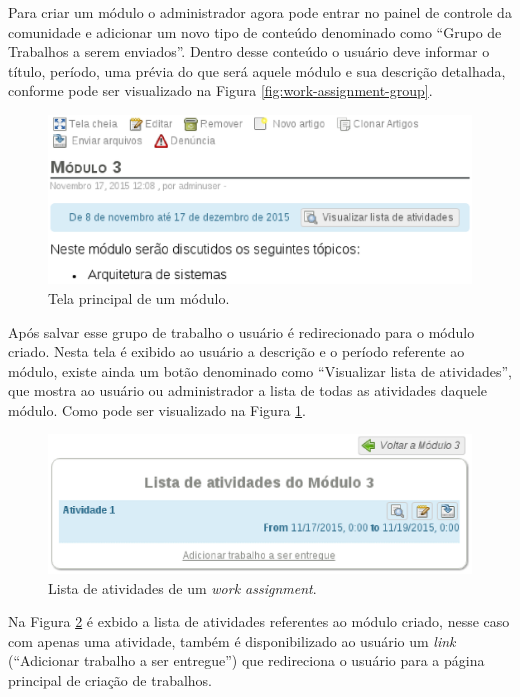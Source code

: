 Para criar um módulo o administrador agora pode entrar no painel de controle da comunidade e adicionar um novo tipo de conteúdo denominado como ``Grupo de Trabalhos a serem enviados''. Dentro desse conteúdo o usuário deve informar o título, período, uma prévia do que será aquele módulo e sua descrição detalhada, conforme pode ser visualizado na Figura \ref{fig:work-assignment-group}.

\begin{figure}[h]
    \centering
    \includegraphics[keepaspectratio=true,scale=0.6]
      {figuras/principal-group.eps}
    \caption{Tela principal de um módulo.}
    \label{fig:principal-group}
\end{figure}

Após salvar esse grupo de trabalho o usuário é redirecionado para o módulo criado. Nesta tela é exibido ao usuário a descrição e o período referente ao módulo, existe ainda um botão denominado como ``Visualizar lista de atividades'', que mostra ao usuário ou administrador a lista de todas as atividades daquele módulo. Como pode ser visualizado na Figura \ref{fig:principal-group}.

\begin{figure}[h]
    \centering
    \includegraphics[keepaspectratio=true,scale=0.6]
      {figuras/lista-atividades.eps}
    \caption{Lista de atividades de um \textit{work assignment}.}
    \label{fig:lista-atividades}
\end{figure}

Na Figura \ref{fig:lista-atividades} é exbido a lista de atividades referentes ao módulo criado, nesse caso com apenas uma atividade, também é disponibilizado ao usuário um \textit{link} (``Adicionar trabalho a ser entregue'') que redireciona o usuário para a página principal de criação de trabalhos.

